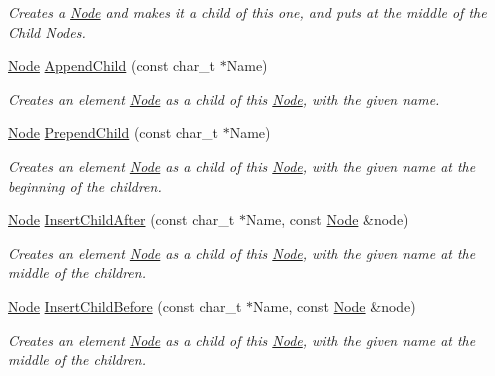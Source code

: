 \begin{DoxyCompactItemize}
\begin{DoxyCompactList}\small\item\em Creates a \hyperlink{classphys_1_1xml_1_1Node}{Node} and makes it a child of this one, and puts at the middle of the Child Nodes. \item\end{DoxyCompactList}\item 
\hyperlink{classphys_1_1xml_1_1Node}{Node} \hyperlink{classphys_1_1xml_1_1Node_a7e9b4518e4d12517bc5ff756054e7395}{AppendChild} (const char\_\-t $\ast$Name)
\begin{DoxyCompactList}\small\item\em Creates an element \hyperlink{classphys_1_1xml_1_1Node}{Node} as a child of this \hyperlink{classphys_1_1xml_1_1Node}{Node}, with the given name. \item\end{DoxyCompactList}\item 
\hyperlink{classphys_1_1xml_1_1Node}{Node} \hyperlink{classphys_1_1xml_1_1Node_a643a7e8d8cbee41647e4e1121660b5d0}{PrependChild} (const char\_\-t $\ast$Name)
\begin{DoxyCompactList}\small\item\em Creates an element \hyperlink{classphys_1_1xml_1_1Node}{Node} as a child of this \hyperlink{classphys_1_1xml_1_1Node}{Node}, with the given name at the beginning of the children. \item\end{DoxyCompactList}\item 
\hyperlink{classphys_1_1xml_1_1Node}{Node} \hyperlink{classphys_1_1xml_1_1Node_a3a2bfe2c267c3ceb96dc4bdae6651a33}{InsertChildAfter} (const char\_\-t $\ast$Name, const \hyperlink{classphys_1_1xml_1_1Node}{Node} \&node)
\begin{DoxyCompactList}\small\item\em Creates an element \hyperlink{classphys_1_1xml_1_1Node}{Node} as a child of this \hyperlink{classphys_1_1xml_1_1Node}{Node}, with the given name at the middle of the children. \item\end{DoxyCompactList}\item 
\hyperlink{classphys_1_1xml_1_1Node}{Node} \hyperlink{classphys_1_1xml_1_1Node_a8602cbfd1272b3c42c0ca1675076f3b2}{InsertChildBefore} (const char\_\-t $\ast$Name, const \hyperlink{classphys_1_1xml_1_1Node}{Node} \&node)
\begin{DoxyCompactList}\small\item\em Creates an element \hyperlink{classphys_1_1xml_1_1Node}{Node} as a child of this \hyperlink{classphys_1_1xml_1_1Node}{Node}, with the given name at the middle of the children. \item\end{DoxyCompactList}\item 

\end{DoxyCompactItemize}
